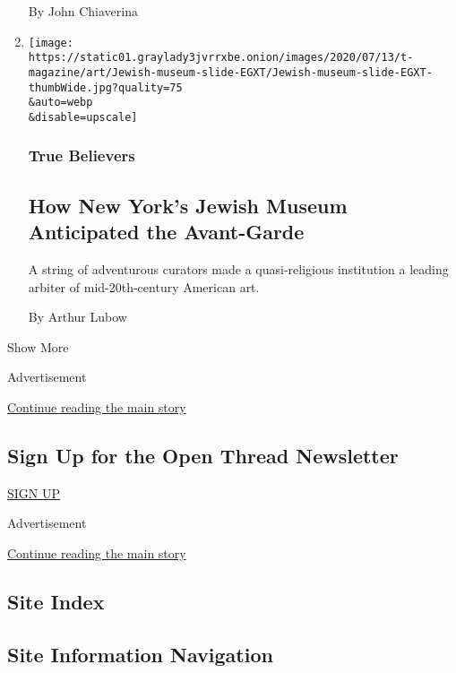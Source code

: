 \begin{enumerate}
  By John Chiaverina
\item
  \href{/2020/07/23/t-magazine/jewish-museum-new-york.html}{}

  \texttt{[image: https://static01.graylady3jvrrxbe.onion/images/2020/07/13/t-magazine/art/Jewish-museum-slide-EGXT/Jewish-museum-slide-EGXT-thumbWide.jpg?quality=75\\\&auto=webp\\\&disable=upscale]}

  \hypertarget{true-believers-3}{%
  \subsubsection{True Believers}\label{true-believers-3}}

  \hypertarget{how-new-yorks-jewish-museum-anticipated-the-avant-garde}{%
  \subsection{How New York's Jewish Museum Anticipated the
  Avant-Garde}\label{how-new-yorks-jewish-museum-anticipated-the-avant-garde}}

  A string of adventurous curators made a quasi-religious institution a
  leading arbiter of mid-20th-century American art.

  By Arthur Lubow
\end{enumerate}

Show More

Advertisement

\protect\hyperlink{after-mid2}{Continue reading the main story}

\hypertarget{sign-up-for-the-open-thread-newsletter}{%
\subsection{Sign Up for the Open Thread
Newsletter}\label{sign-up-for-the-open-thread-newsletter}}

\href{/newsletters/signup/TZ}{SIGN UP}

Advertisement

\protect\hyperlink{after-mktg}{Continue reading the main story}

\hypertarget{site-index}{%
\subsection{Site Index}\label{site-index}}

\hypertarget{site-information-navigation}{%
\subsection{Site Information
Navigation}\label{site-information-navigation}}

